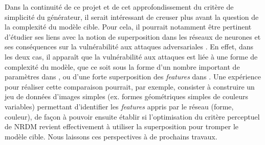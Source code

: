 \documentclass{article}
\begin{document}
\noindent Dans la continuité de ce projet et de cet approfondissement du critère de simplicité du générateur, il serait intéressant de creuser plus avant la question de la complexité du modèle cible. Pour cela, il pourrait notamment être pertinent d'étudier ses liens avec la notion de superposition dans les réseaux de neurones et ses conséquences sur la vulnérabilité aux attaques adversariales \cite{Elhage2022ToyMO}. En effet, dans les deux cas, il apparaît que la vulnérabilité aux attaques est liée à une forme de complexité du modèle, que ce soit sous la forme d'un nombre important de paramètres dans \citet{Demontis2018WhyDA}, ou d'une forte superposition des \textit{features} dans \citet{Elhage2022ToyMO}. Une expérience pour réaliser cette comparaison pourrait, par exemple, consister à construire un jeu de données d'images simples (ex. formes géométriques simples de couleurs variables) permettant d'identifier les \textit{features} appris par le réseau (forme, couleur), de façon à pouvoir ensuite établir si l'optimisation du critère perceptuel de NRDM revient effectivement à utiliser la superposition pour tromper le modèle cible. Nous laissons ces perspectives à de prochains travaux.



\end{document}
